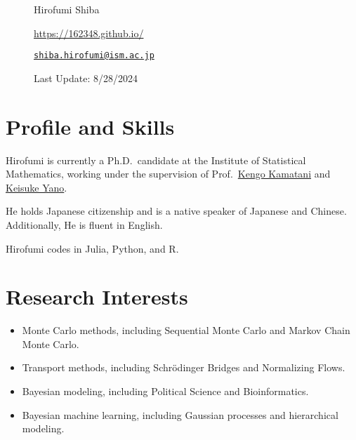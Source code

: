 \documentclass[
  11pt,
]{article}
\author{}
\date{}
\begin{document}
\begin{figure}

\begin{minipage}{0.50\linewidth}

\Huge Hirofumi Shiba

\end{minipage}%
%
\begin{minipage}{0.50\linewidth}

\color{minty}

\hfill {} \url{https://162348.github.io/}

\par

\hfill {}
\href{mailto:shiba.hirofumi@ism.ac.jp}{\nolinkurl{shiba.hirofumi@ism.ac.jp}}

\par

\color{gray}\hfill {Last Update: 8/28/2024}\end{minipage}%

\end{figure}%

\vspace{-1em}

\section{Profile and Skills}\label{profile-and-skills}

Hirofumi is currently a Ph.D.~candidate at the Institute of Statistical
Mathematics, working under the supervision of
Prof.~\href{https://sites.google.com/view/kengokamatani/home}{Kengo
Kamatani} and \href{https://sites.google.com/site/kyanostat/}{Keisuke
Yano}.

He holds Japanese citizenship and is a native speaker of Japanese and
Chinese. Additionally, He is fluent in English.

Hirofumi codes in Julia, Python, and R.

\section{Research Interests}\label{research-interests}

\begin{itemize}
\item
  Monte Carlo methods, including Sequential Monte Carlo and Markov Chain
  Monte Carlo.
\item
  Transport methods, including Schrödinger Bridges and Normalizing
  Flows.
\item
  Bayesian modeling, including Political Science and Bioinformatics.
\item
  Bayesian machine learning, including Gaussian processes and
  hierarchical modeling.
\end{itemize}
\end{document}

